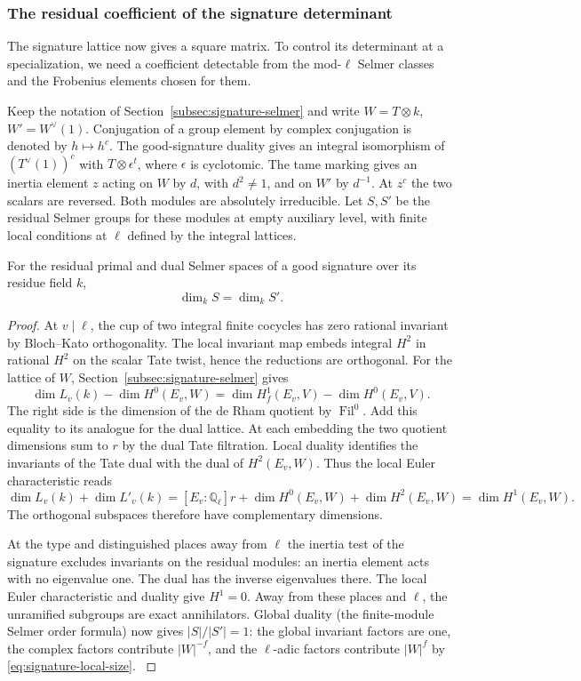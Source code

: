 \subsubsection*{The residual coefficient of the signature determinant}
\label{subsec:residual-twist}

The signature lattice now gives a square matrix. To control its determinant at a specialization, we need a coefficient detectable from the mod-\(\ell\) Selmer classes and the Frobenius elements chosen for them.

Keep the notation of Section~\ref{subsec:signature-selmer} and write
\(W=T\otimes k\), \(W'=W^\vee(1)\). Conjugation of a group
element by complex conjugation is denoted by \(h\mapsto h^c\).
The good-signature duality gives an integral isomorphism of
\((T^\vee(1))^c\) with \(T\otimes\epsilon^t\), where \(\epsilon\)
is cyclotomic. The tame marking gives an inertia element \(z\)
acting on \(W\) by \(d\), with \(d^2\ne1\), and on \(W'\) by
\(d^{-1}\). At \(z^c\) the two scalars are reversed.
Both modules are absolutely irreducible. Let \(S,S'\) be the
residual Selmer groups for these modules at empty auxiliary
level, with finite local conditions at \(\ell\) defined by
the integral lattices.

\begin{lemma}
For the residual primal and dual Selmer spaces of a good signature over its residue field \(k\),
\[
 \dim_k S=\dim_k S'.
\]
\end{lemma}
\begin{proof}
At \(v\mid\ell\), the cup of two integral finite cocycles has
zero rational invariant by Bloch--Kato orthogonality. The local
invariant map embeds integral \(H^2\) in rational \(H^2\) on the
scalar Tate twist, hence the reductions are orthogonal. For the
lattice of \(W\), Section~\ref{subsec:signature-selmer} gives
\[
 \dim L_v(k)-\dim H^0(E_v,W)
   =\dim H^1_f(E_v,V)-\dim H^0(E_v,V).
\]
The right side is the dimension of the de Rham quotient by
\(\operatorname{Fil}^0\). Add this equality to its analogue for
the dual lattice. At each embedding the two quotient dimensions
sum to \(r\) by the dual Tate filtration. Local duality identifies the invariants of the Tate dual with the
dual of \(H^2(E_v,W)\). Thus the local Euler characteristic reads
\[
 \dim L_v(k)+\dim L'_v(k)
 = [E_v:\mathbb Q_\ell]r+\dim H^0(E_v,W)+\dim H^2(E_v,W)
 =\dim H^1(E_v,W).
\]
The orthogonal subspaces therefore have complementary dimensions.

At the type and distinguished places
away from \(\ell\) the inertia test of the signature excludes
invariants on the residual modules: an
inertia element acts with no eigenvalue one. The dual has
the inverse eigenvalues there. The local Euler characteristic
and duality give \(H^1=0\). Away from these places and
\(\ell\), the unramified subgroups are exact annihilators.
Global duality (the finite-module Selmer order formula) now
gives \(|S|/|S'|=1\): the global invariant factors are one,
the complex factors contribute \(|W|^{-f}\), and the
\(\ell\)-adic factors contribute \(|W|^f\) by
\eqref{eq:signature-local-size}. \cite{bloch-kato,milne-duality}

\end{proof}
